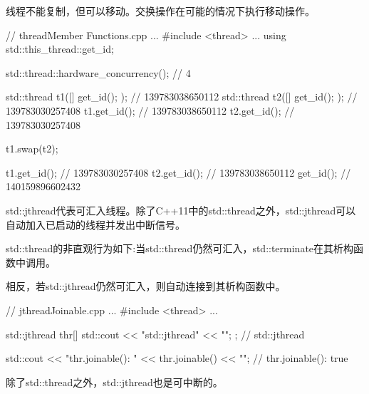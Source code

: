线程不能复制，但可以移动。交换操作在可能的情况下执行移动操作。


\begin{cpp}
// threadMember Functions.cpp
...
#include <thread>
...
using std::this_thread::get_id;

std::thread::hardware_concurrency(); // 4

std::thread t1([]{ get_id(); }); // 139783038650112
std::thread t2([]{ get_id(); }); // 139783030257408
t1.get_id(); // 139783038650112
t2.get_id(); // 139783030257408

t1.swap(t2);

t1.get_id(); // 139783030257408
t2.get_id(); // 139783038650112
get_id(); // 140159896602432
\end{cpp}


std::jthread代表可汇入线程。除了C++11中的std::thread之外，std::jthread可以自动加入已启动的线程并发出中断信号。


std::thread的非直观行为如下:当std::thread仍然可汇入，std::terminate在其析构函数中调用。

相反，若std::jthread仍然可汇入，则自动连接到其析构函数中。


\begin{cpp}
// jthreadJoinable.cpp
...
#include <thread>
...

std::jthread thr{[]{ std::cout << "std::jthread" << "\n"; }}; // std::jthread

std::cout << "thr.joinable(): " << thr.joinable() << "\n"; // thr.joinable(): true
\end{cpp}

除了std::thread之外，std::jthread也是可中断的。














